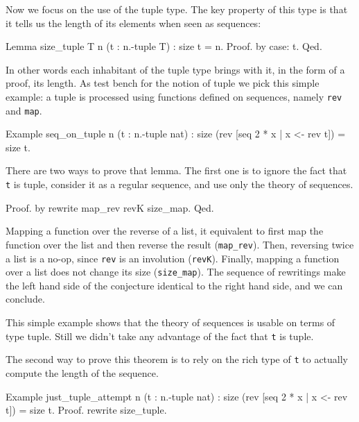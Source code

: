 Now we focus on the use of the tuple type.  The key property of this
type is that it tells us the length of its elements when seen as
sequences:

\begin{coq}{}
Lemma size_tuple {T n} (t : n.-tuple T) : size t = n.
Proof. by case: t. Qed.
\end{coq}

In other words each inhabitant of the tuple type brings with it,
in the form of a proof, its length.  As test bench for the notion
of tuple we pick this simple example: a tuple is processed using
functions defined on sequences, namely \lstinline/rev/ and
\lstinline/map/.

\begin{coq}{}
Example seq_on_tuple n (t : n.-tuple nat) :
  size (rev [seq 2 * x | x <- rev t]) = size t.
\end{coq}

There are two ways to prove that lemma.  The first one is
to ignore the fact that \lstinline/t/ is tuple, consider it
as a regular sequence, and use only the theory of sequences.

\begin{coq}{}
Proof. by rewrite map_rev revK size_map. Qed.
\end{coq}

Mapping a function over the reverse of a list, it equivalent to
first map the function over the list and then reverse the result
(\lstinline/map_rev/).  Then, reversing twice a list is a no-op, since
\lstinline/rev/ is an involution
(\lstinline/revK/).  Finally, mapping a function over a list does not
change its size (\lstinline/size_map/).  The sequence of rewritings
make the left hand side of the conjecture identical to the right hand
side, and we can conclude.

This simple example shows that the theory of sequences is usable
on terms of type tuple.  Still we didn't take any advantage of
the fact that  \lstinline/t/ is tuple.

The second way to prove this theorem is to rely on the rich type
of \lstinline/t/ to actually compute the length of the sequence.

\begin{coq}{}
Example just_tuple_attempt n (t : n.-tuple nat) :
  size (rev [seq 2 * x | x <- rev t]) = size t.
Proof. rewrite size_tuple. 
\end{coq}

